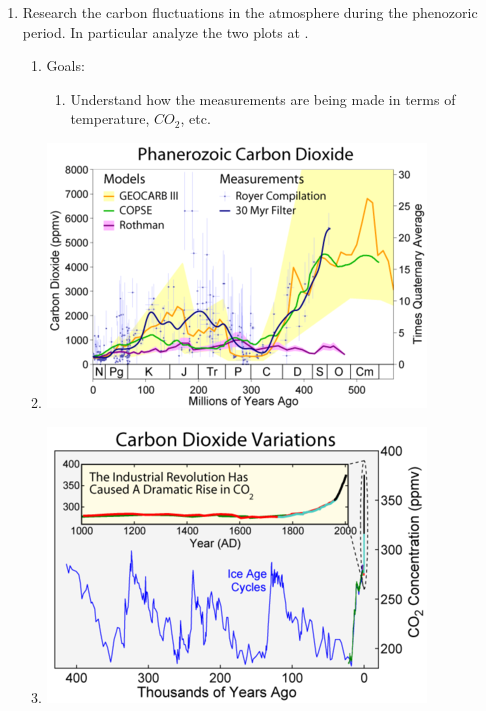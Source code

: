 \documentclass[final,10pt,reqno,twoside]{article}
\begin{document}
\begin{enumerate}[leftmargin=0cm, align=left]
    \item Research the carbon fluctuations in the atmosphere during the phenozoric period. In particular analyze the two plots at .
         \begin{enumerate}[label=\textbf{(\alph*})]
           \item Goals: 
             \begin{enumerate}
               \item Understand how the measurements are being made in terms of temperature, $CO_2$, etc.
             \end{enumerate}
           \item \includegraphics{00FIGURES/Phanerozoic_Carbon_Dioxide.png}
           \item \includegraphics{00FIGURES/Carbon_Dioxide_400kyr.png}
         \end{enumerate} 
         

\end{enumerate}
\end{document}
